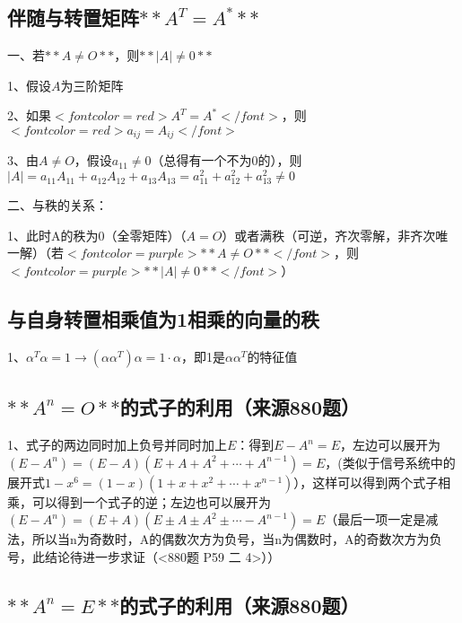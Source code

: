 \subsection{伴随与转置矩阵$ **A^T=A^*** $}

一、若$ **A \ne O** $，则$ **|A|\ne 0** $

1、假设$ A $为三阶矩阵

2、如果$ <font color=red>A^T=A^*</font> $，则$ <font color=red>a_{ij}=A_{ij}</font> $

3、由$ A \ne O $，假设$ a_{11} \ne 0 $（总得有一个不为0的），则$ |A|=a_{11}A_{11}+a_{12}A_{12}+a_{13}A_{13} = a_{11}^2 + a_{12}^2+a_{13}^2\ne 0 $

二、与秩的关系：

1、此时A的秩为0（全零矩阵）（$ A = O $）或者满秩（可逆，齐次零解，非齐次唯一解）（若$ <font color=purple>**A \ne O**</font> $，则$ <font color=purple>**|A|\ne 0**</font> $）



\subsection{与自身转置相乘值为1相乘的向量的秩}

1、$ \alpha^T\alpha=1 \rightarrow (\alpha\alpha^T)\alpha = 1·\alpha $，即1是$ \alpha\alpha^T $的特征值



\subsection{$ **A^n=O** $的式子的利用（来源880题）}

1、式子的两边同时加上负号并同时加上$ E $：得到$ E-A^n=E $，左边可以展开为$ (E-A^n)=(E-A)(E+A+A^{2}+\cdots +A^{n-1})=E $，(类似于信号系统中的展开式$ 1-x^6=(1-x)(1+x+x^2+\cdots+x^{n-1}) $），这样可以得到两个式子相乘，可以得到一个式子的逆；左边也可以展开为$ (E-A^n)=(E+A)(E\pm A\pm A^{2}\pm\cdots -A^{n-1})=E $（最后一项一定是减法，所以当n为奇数时，A的偶数次方为负号，当n为偶数时，A的奇数次方为负号，此结论待进一步求证（<880题 P59 二 4>））



\subsection{$ **A^n=E** $的式子的利用（来源880题）}

